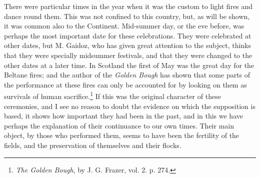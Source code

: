 \documentclass[a4paper, 11pt, oneside, polutonikogreek, english]{article}
\begin{document}
There were particular times in the year when it was the custom to light fires and dance round them. This was not confined to this country, but, as will be shown, it was common also to the Continent. Mid-summer day, or the eve before, was perhaps the most important date for these celebrations. They were celebrated at other dates, but M. Gaidoz, who has given great attention to the subject, thinks that they were specially midsummer festivals, and that they were changed to the other dates at a later time. In Scotland the first of May was the great day for the Beltane fires; and the author of the \emph{Golden Bough} has shown that some parts of the performance at these fires can only be accounted for by looking on them as survivals of human sacrifice.\footnote{\emph{The Golden Bough}, by J. G. Frazer, vol. 2. p. 274.} If this was the original character of these ceremonies, and I see no reason to doubt the evidence on which the supposition is based, it shows how important they had been in the past, and in this we have perhaps the explanation of their continuance to our own times. Their main object, by those who performed them, seems to have been the fertility of the fields, and the preservation of themselves and their flocks.
\end{document}
